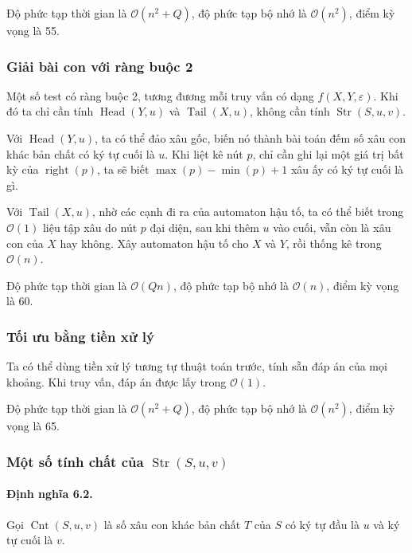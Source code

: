 \documentclass[11pt]{article}
\newcommand{\Oh}{\mathcal{O}}
\begin{document}
Độ phức tạp thời gian là \(\Oh(n^2+Q)\), độ phức tạp bộ nhớ là \(\Oh(n^2)\),
điểm kỳ vọng là 55.

\subsubsection{Giải bài con với ràng buộc 2}

Một số test có ràng buộc 2, tương đương mỗi truy vấn có dạng
\(f(X,Y,\varepsilon)\). Khi đó ta chỉ cần tính \(\operatorname{Head}(Y,u)\) và
\(\operatorname{Tail}(X,u)\), không cần tính \(\operatorname{Str}(S,u,v)\).

Với \(\operatorname{Head}(Y,u)\), ta có thể đảo xâu gốc, biến nó thành bài
toán đếm số xâu con khác bản chất có ký tự cuối là \(u\). Khi liệt kê nút
\(p\), chỉ cần ghi lại một giá trị bất kỳ của \(\operatorname{right}(p)\), ta
sẽ biết \(\max(p)-\min(p)+1\) xâu ấy có ký tự cuối là gì.

Với \(\operatorname{Tail}(X,u)\), nhờ các cạnh đi ra của automaton hậu tố, ta
có thể biết trong \(\Oh(1)\) liệu tập xâu do nút \(p\) đại diện, sau khi thêm
\(u\) vào cuối, vẫn còn là xâu con của \(X\) hay không. Xây automaton hậu tố
cho \(X\) và \(Y\), rồi thống kê trong \(\Oh(n)\).

Độ phức tạp thời gian là \(\Oh(Qn)\), độ phức tạp bộ nhớ là \(\Oh(n)\), điểm
kỳ vọng là 60.

\subsubsection{Tối ưu bằng tiền xử lý}

Ta có thể dùng tiền xử lý tương tự thuật toán trước, tính sẵn đáp án của mọi
khoảng. Khi truy vấn, đáp án được lấy trong \(\Oh(1)\).

Độ phức tạp thời gian là \(\Oh(n^2+Q)\), độ phức tạp bộ nhớ là \(\Oh(n^2)\),
điểm kỳ vọng là 65.

\subsubsection{Một số tính chất của
\texorpdfstring{\(\operatorname{Str}(S,u,v)\)}{Str(S,u,v)}}

\paragraph{Định nghĩa 6.2.}
Gọi \(\operatorname{Cnt}(S,u,v)\) là số xâu con khác bản chất \(T\) của \(S\)
có ký tự đầu là \(u\) và ký tự cuối là \(v\).
\end{document}
